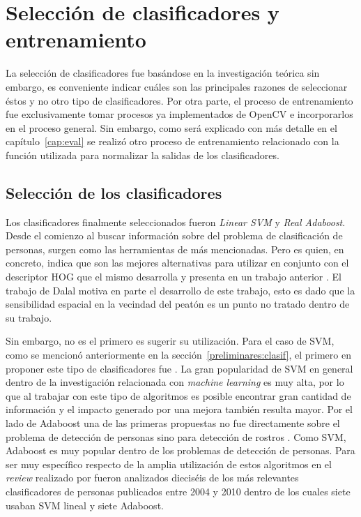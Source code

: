 \section{Selección de clasificadores y entrenamiento}
\label{clasificadores:seleccion}

La selección de clasificadores fue basándose en la investigación teórica sin embargo, es conveniente indicar cuáles son las principales razones de seleccionar éstos y no otro tipo de clasificadores. Por otra parte, el proceso de entrenamiento fue exclusivamente tomar procesos ya implementados de OpenCV e incorporarlos en el proceso general. Sin embargo, como será explicado con más detalle en el capítulo~\ref{cap:eval} se realizó otro proceso de entrenamiento relacionado con la función utilizada para normalizar la salidas de los clasificadores.

\subsection{Selección de los clasificadores}
\label{subsect:seleccionclasif}

Los clasificadores finalmente seleccionados fueron \textit{Linear SVM} y \textit{Real Adaboost}. Desde el comienzo al buscar información sobre del problema de clasificación de personas, surgen como las herramientas de más mencionadas. Pero es \cite{dalal2006} quien, en concreto, indica que son las mejores alternativas para utilizar en conjunto con el descriptor HOG que el mismo desarrolla y presenta en un trabajo anterior \citep{dalal2005}. El trabajo de Dalal motiva en parte el desarrollo de este trabajo, esto es dado que la sensibilidad espacial en la vecindad del peatón es un punto no tratado dentro de su trabajo.  

Sin embargo, \cite{dalal2006} no es el primero es sugerir su utilización. Para el caso de SVM, como se mencionó anteriormente en la sección~\ref{preliminares:clasif}, el primero en proponer este tipo de clasificadores fue \cite{Papageorgiou2000}. La gran popularidad de SVM en general dentro de la investigación relacionada con \textit{machine learning} es muy alta, por lo que al trabajar con este tipo de algoritmos es posible encontrar gran cantidad de información y el impacto generado por una mejora también resulta mayor. Por el lado de Adaboost una de las primeras propuestas no fue directamente sobre el problema de detección de personas sino para detección de rostros \citep{viola2001}. Como SVM, Adaboost es muy popular dentro de los problemas de detección de personas. Para ser muy específico respecto de la amplia utilización de estos algoritmos en el \textit{review} realizado por \cite{dollar2012} fueron analizados dieciséis de los más relevantes clasificadores de personas publicados entre 2004 y 2010 dentro de los cuales siete usaban SVM lineal y siete Adaboost.

